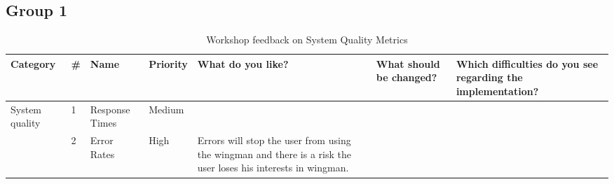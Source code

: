 \documentclass[
	english,
	ruledheaders=section,%
	class=report,%
	thesis={type=bachelor},%
	accentcolor=1b,%
	custommargins=true,%
	marginpar=false,%
	parskip=half-,%
	fontsize=11pt,%
	DIV=14,
]{tudapub}
\begin{document}
\subsection*{Group 1}

\begin{table}
    \centering
    \small 
    \caption{Workshop feedback on System Quality Metrics}
    \label{tab:system_quality}
    \begin{tabularx}{\textheight}{p{2.2cm} l >{\RaggedRight\arraybackslash}X l >{\RaggedRight\arraybackslash}X >{\RaggedRight\arraybackslash}X >{\RaggedRight\arraybackslash}X}
        \toprule
        \textbf{Category} & \textbf{\#} & \textbf{Name} & \textbf{Priority} & \textbf{What do you like?} & \textbf{What should be changed?} & \textbf{Which difficulties do you see regarding the implementation?} \\
        \midrule
        
        \multirow{2}{=}{System quality} 
        & 1 & Response Times & Medium & & & \\
        \cmidrule(l){2-7}
        & 2 & Error Rates & High & Errors will stop the user from using the wingman and there is a risk the user loses his interests in wingman. & & \\
        \bottomrule
    \end{tabularx}
\end{table}
\end{document}
